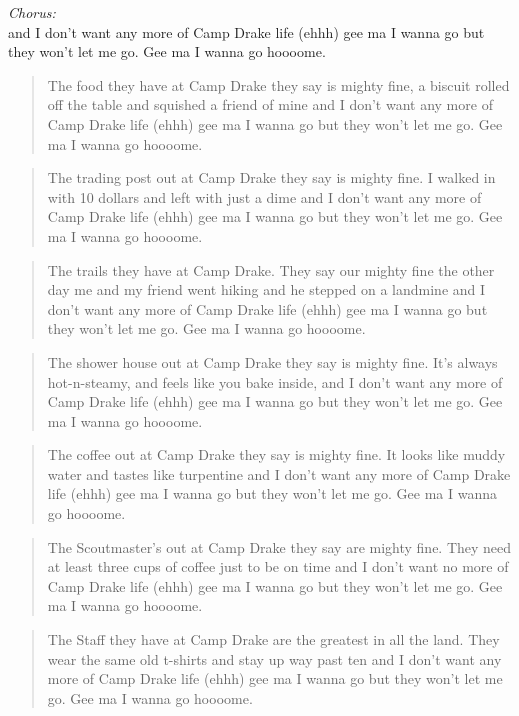
\begin{center}
\textit{Chorus:} \\
and I don't want any more of Camp Drake life (ehhh) gee ma I wanna go but they won't let me go. Gee ma I wanna go hoooome.
\end{center}

\begin{verse}
The food they have at Camp Drake they say is mighty fine, a biscuit rolled off the table and squished a friend of mine and I don't want any more of Camp Drake life (ehhh) gee ma I wanna go but they won't let me go. Gee ma I wanna go hoooome. \\
\end{verse}

\begin{verse}
The trading post out at Camp Drake they say is mighty fine. I walked in with 10 dollars and left with just a dime and I don't want any more of Camp Drake life (ehhh) gee ma I wanna go but they won't let me go. Gee ma I wanna go hoooome. \\
\end{verse}

\begin{verse}
The trails they have at Camp Drake. They say our mighty fine the other day me and my friend went hiking and he stepped on a landmine and I don't want any more of Camp Drake life (ehhh) gee ma I wanna go but they won't let me go. Gee ma I wanna go hoooome. \\
\end{verse}

\begin{verse}
The shower house out at Camp Drake they say is mighty fine. It's always hot-n-steamy, and feels like you bake inside, and I don't want any more of Camp Drake life (ehhh) gee ma I wanna go but they won't let me go. Gee ma I wanna go hoooome. \\
\end{verse}

\begin{verse}
The coffee out at Camp Drake they say is mighty fine. It looks like muddy water and tastes like turpentine and I don't want any more of Camp Drake life (ehhh) gee ma I wanna go but they won't let me go. Gee ma I wanna go hoooome. \\
\end{verse}

\begin{verse}
The Scoutmaster's out at Camp Drake they say are mighty fine. They need at least three cups of coffee just to be on time and I don't want no more of Camp Drake life (ehhh) gee ma I wanna go but they won't let me go. Gee ma I wanna go hoooome. \\
\end{verse}

\begin{verse}
The Staff they have at Camp Drake are the greatest in all the land. They wear the same old t-shirts and stay up way past ten and I don't want any more of Camp Drake life (ehhh) gee ma I wanna go but they won't let me go. Gee ma I wanna go hoooome. \\
\end{verse}
